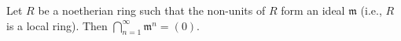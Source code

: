 Let $R$ be a noetherian ring such that the non-units of $R$ form an ideal $\mathfrak{m}$ (i.e., $R$ is a local ring). Then $\bigcap_{n=1}^{\infty} \mathfrak{m}^n = (0)$.
